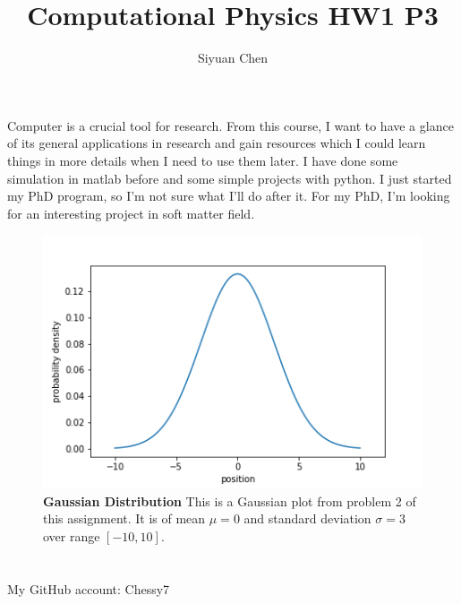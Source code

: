\documentclass[11pt]{article}
\title{Computational Physics HW1 P3}
\author{Siyuan Chen}
\begin{document}
\maketitle

\section*{}
Computer is a crucial tool for research. From this course, I want to have a glance of its general applications in research and gain resources which I could learn things in more details when I need to use them later. I have done some simulation in matlab before and some simple projects with python. I just started my PhD program, so I'm not sure what I'll do after it. For my PhD, I'm looking for an interesting project in soft matter field.

\begin{figure}
    \includegraphics{gaussian.png}
    \caption{\textbf{Gaussian Distribution} This is a Gaussian plot from problem 2 of this assignment. It is of mean $\mu=0$ and standard deviation $\sigma=3$ over range $[-10,10]$.
    }
    \label{fig}
\end{figure}

\section*{}
My GitHub account: Chessy7
\end{document}
